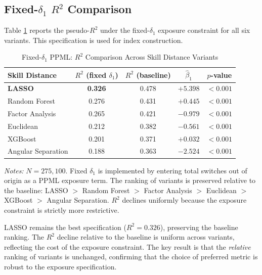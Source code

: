 \documentclass[12pt]{article}
\begin{document}
\subsection{Fixed-$\delta_1$ $R^2$ Comparison}
\label{sec:results_fixed}

Table \ref{tab:fixed_r2} reports the pseudo-$R^2$ under the fixed-$\delta_1$ exposure constraint for all six variants. This specification is used for index construction.

\begin{table}[H]
\centering
\caption{Fixed-$\delta_1$ PPML: $R^2$ Comparison Across Skill Distance Variants}
\label{tab:fixed_r2}
\begin{tabular}{lcccc}
\toprule
\textbf{Skill Distance} & \textbf{$R^2$ (fixed $\delta_1$)} & \textbf{$R^2$ (baseline)} & \textbf{$\hat{\beta}_1$} & \textbf{$p$-value} \\
\midrule
\textbf{LASSO}              & \textbf{0.326} & 0.478 & $+5.398$ & $<0.001$ \\
Random Forest               & 0.276          & 0.431 & $+0.445$ & $<0.001$ \\
Factor Analysis             & 0.265          & 0.421 & $-0.979$ & $<0.001$ \\
Euclidean                   & 0.212          & 0.382 & $-0.561$ & $<0.001$ \\
XGBoost                     & 0.201          & 0.371 & $+0.032$ & $<0.001$ \\
Angular Separation          & 0.188          & 0.363 & $-2.524$ & $<0.001$ \\
\bottomrule
\end{tabular}
\begin{minipage}{0.9\textwidth}
\vspace{0.5em}
\footnotesize \textit{Notes:} $N = 275{,}100$. Fixed $\delta_1$ is implemented by entering total switches out of origin as a PPML exposure term. The ranking of variants is preserved relative to the baseline: LASSO $>$ Random Forest $>$ Factor Analysis $>$ Euclidean $>$ XGBoost $>$ Angular Separation. $R^2$ declines uniformly because the exposure constraint is strictly more restrictive.
\end{minipage}
\end{table}

LASSO remains the best specification ($R^2 = 0.326$), preserving the baseline ranking. The $R^2$ decline relative to the baseline is uniform across variants, reflecting the cost of the exposure constraint. The key result is that the \emph{relative} ranking of variants is unchanged, confirming that the choice of preferred metric is robust to the exposure specification.
\end{document}
